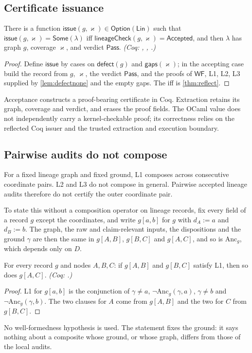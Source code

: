 \subsection{Certificate issuance}
\begin{thm}\label{thm:issue}
There is a function $\mathsf{issue}(g,\varkappa) \in \mathsf{Option}(\mathsf{Lin})$ such that $\mathsf{issue}(g,\varkappa) = \mathsf{Some}(\lambda)$ iff $\mathsf{lineageCheck}(g,\varkappa) = \mathsf{Accepted}$, and then $\lambda$ has graph $g$, coverage $\varkappa$, and verdict $\mathsf{Pass}$. \emph{(Coq: , , .)}
\end{thm}
\begin{proof}
Define $\mathsf{issue}$ by cases on $\mathsf{defect}(g)$ and $\mathsf{gaps}(\varkappa)$; in the accepting case build the record from $g$, $\varkappa$, the verdict $\mathsf{Pass}$, and the proofs of $\mathsf{WF}$, L1, L2, L3 supplied by \cref{lem:defectnone} and the empty gaps. The iff is \cref{thm:reflect}.
\end{proof}
Acceptance constructs a proof-bearing certificate in Coq. Extraction retains its graph, coverage and verdict, and erases the proof fields. The OCaml value does not independently carry a kernel-checkable proof; its correctness relies on the reflected Coq issuer and the trusted extraction and execution boundary.

\subsection{Pairwise audits do not compose}\label{sec:noncompose}
For a fixed lineage graph and fixed ground, L1 composes across consecutive coordinate pairs. L2 and L3 do not compose in general. Pairwise accepted lineage audits therefore do not certify the outer coordinate pair.

To state this without a composition operator on lineage records, fix every field of a record $g$ except the coordinates, and write $g[a,b]$ for $g$ with $d_A := a$ and $d_B := b$. The graph, the raw and claim-relevant inputs, the dispositions and the ground $\gamma$ are then the same in $g[A,B]$, $g[B,C]$ and $g[A,C]$, and so is $\mathrm{Anc}_g$, which depends only on $D$.

\begin{prop}\label{prop:l1compose}
For every record $g$ and nodes $A,B,C$: if $g[A,B]$ and $g[B,C]$ satisfy L1, then so does $g[A,C]$. \emph{(Coq: .)}
\end{prop}
\begin{proof}
L1 for $g[a,b]$ is the conjunction of $\gamma \neq a$, $\neg\mathrm{Anc}_g(\gamma,a)$, $\gamma \neq b$ and $\neg\mathrm{Anc}_g(\gamma,b)$. The two clauses for $A$ come from $g[A,B]$ and the two for $C$ from $g[B,C]$.
\end{proof}
No well-formedness hypothesis is used. The statement fixes the ground: it says nothing about a composite whose ground, or whose graph, differs from those of the local audits.

